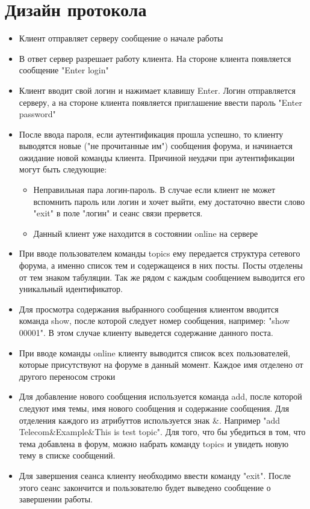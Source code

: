 \documentclass[10pt,a4paper]{report}
\begin{document}
\section{Дизайн протокола}
\begin{itemize}
\item Клиент отправляет серверу сообщение о начале работы 
\item В ответ сервер разрешает работу клиента. На стороне клиента появляется сообщение "Enter login"
\item Клиент вводит свой логин и нажимает клавишу Enter. Логин отправляется серверу, а на стороне клиента появляется приглашение ввести пароль "Enter password"
\item После ввода пароля, если аутентификация прошла успешно, то клиенту выводятся новые ("не прочитанные им") сообщения форума, и начинается ожидание новой команды клиента. Причиной неудачи при аутентификации могут быть следующие:
\begin{itemize}
\item Неправильная пара логин-пароль. В случае если клиент не может вспомнить пароль или логин и хочет выйти, ему достаточно ввести слово "exit" в поле "логин" и сеанс связи прервется.
\item Данный клиент уже находится в состоянии online на сервере
\end{itemize}
\item При вводе пользователем команды topics ему передается структура сетевого форума, а именно список тем и содержащеися в них посты. Посты отделены от тем знаком табуляции. Так же рядом с каждым сообщением выводится его уникальный идентификатор.
\item Для просмотра содержания выбранного сообщения клиентом вводится команда show, после которой следует номер сообщения, например: "show 00001". В этом случае клиенту выведется содержание данного поста.
\item При вводе команды online клиенту выводится список всех пользователей, которые присутствуют на форуме в данный момент. Каждое имя отделено от другого переносом строки
\item Для добавление нового сообщения используется команда add, после которой следуют имя темы, имя нового сообщения и содержание сообщения. Для отделения каждого из атрибуттов используется знак \&. Например "add Telecom\&Example\&This is test topic". Для того, что бы убедиться в том, что тема добавлена в форум, можно набрать команду topics и увидеть новую тему в списке сообщений.
\item Для завершения сеанса клиенту необходимо ввести команду "exit". После этого сеанс закончится и пользователю будет выведено сообщение о завершении работы.
\end{itemize}
\end{document}
